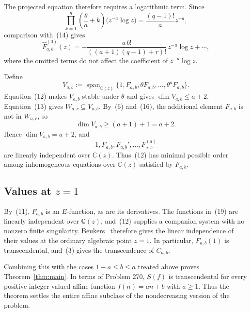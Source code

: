 \documentclass[12pt]{article}
\begin{document}
The projected equation therefore requires a logarithmic term. Since
\[
\prod_{k=1}^{q}\left(\frac{\theta}{a}+k\right)
\bigl(z^{-a}\log z\bigr)
=\frac{(q-1)!}{a}z^{-a},
\]
comparison with~(14) gives
\[
\widehat F_{a,b}^{(0)}(z)
=-\frac{a\,b!}{((a+1)(q-1)+r)!}\,z^{-a}\log z
+\cdots,
\tag{17}
\]
where the omitted terms do not affect the coefficient of $z^{-a}\log z$.

Define
\[
V_{a,b}:=\operatorname{span}_{\mathbb C(z)}
\{1,F_{a,b},\theta F_{a,b},\ldots,\theta^aF_{a,b}\}.
\tag{18}
\]
Equation~(12) makes $V_{a,b}$ stable under $\theta$ and gives $\dim V_{a,b}\leq a+2$. Equation~(13) gives $W_{a,r}\subseteq V_{a,b}$. By~(6) and~(16), the additional element $F_{a,b}$ is not in $W_{a,r}$, so
\[
\dim V_{a,b}\geq(a+1)+1=a+2.
\]
Hence $\dim V_{a,b}=a+2$, and
\[
1,F_{a,b},F_{a,b}',\ldots,F_{a,b}^{(a)}
\tag{19}
\]
are linearly independent over $\mathbb C(z)$. Thus~(12) has minimal possible order among inhomogeneous equations over $\mathbb C(z)$ satisfied by $F_{a,b}$.

\subsection{Values at \texorpdfstring{$z=1$}{z=1}}
\label{sec:evaluation}

By~(11), $F_{a,b}$ is an $E$-function, as are its derivatives. The functions in~(19) are linearly independent over $\overline{\mathbb Q}(z)$, and~(12) supplies a companion system with no nonzero finite singularity. Beukers~\cite[Corollary~1.4]{beukers} therefore gives the linear independence of their values at the ordinary algebraic point $z=1$. In particular, $F_{a,b}(1)$ is transcendental, and~(3) gives the transcendence of $C_{a,b}$.

Combining this with the cases $1-a\leq b\leq a$ treated above proves Theorem~\ref{thm:main}. In terms of Problem 270, $S(f)$ is transcendental for every positive integer-valued affine function $f(n)=an+b$ with $a\geq1$. Thus the theorem settles the entire affine subclass of the nondecreasing version of the problem.
\end{document}
